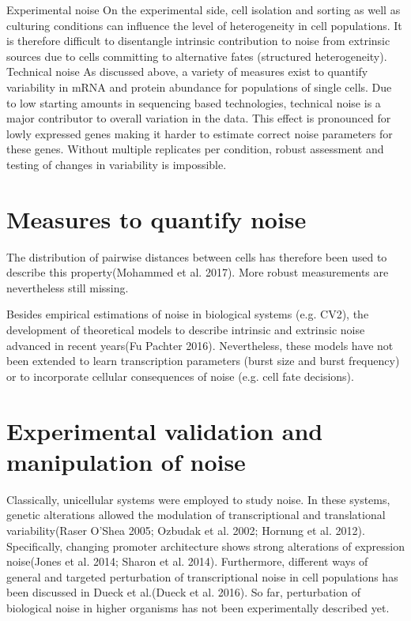 Experimental noise
On the experimental side, cell isolation and sorting as well as culturing conditions can influence the level of heterogeneity in cell populations. It is therefore difficult to disentangle intrinsic contribution to noise from extrinsic sources due to cells committing to alternative fates (structured heterogeneity).  \\

Technical noise
As discussed above, a variety of measures exist to quantify variability in mRNA and protein abundance for populations of single cells. Due to low starting amounts in sequencing based technologies, technical noise is a major contributor to overall variation in the data. This effect is pronounced for lowly expressed genes making it harder to estimate correct noise parameters for these genes. Without multiple replicates per condition, robust assessment and testing of changes in variability is impossible.\\

\section{Measures to quantify noise}

 The distribution of pairwise distances between cells has therefore been used to describe this property(Mohammed et al. 2017). More robust measurements are nevertheless still missing.
 
 Besides empirical estimations of noise in biological systems (e.g. CV2), the development of theoretical models to describe intrinsic and extrinsic noise advanced in recent years(Fu Pachter 2016). Nevertheless, these models have not been extended to learn transcription parameters (burst size and burst frequency) or to incorporate cellular consequences of noise (e.g. cell fate decisions).

\section{Experimental validation and manipulation of noise}

Classically, unicellular systems were employed to study noise. In these systems, genetic alterations allowed the modulation of transcriptional and translational variability(Raser O’Shea 2005; Ozbudak et al. 2002; Hornung et al. 2012). Specifically, changing promoter architecture shows strong alterations of expression noise(Jones et al. 2014; Sharon et al. 2014). Furthermore, different ways of general and targeted perturbation of transcriptional noise in cell populations has been discussed in Dueck et al.(Dueck et al. 2016). So far, perturbation of biological noise in higher organisms has not been experimentally described yet.


